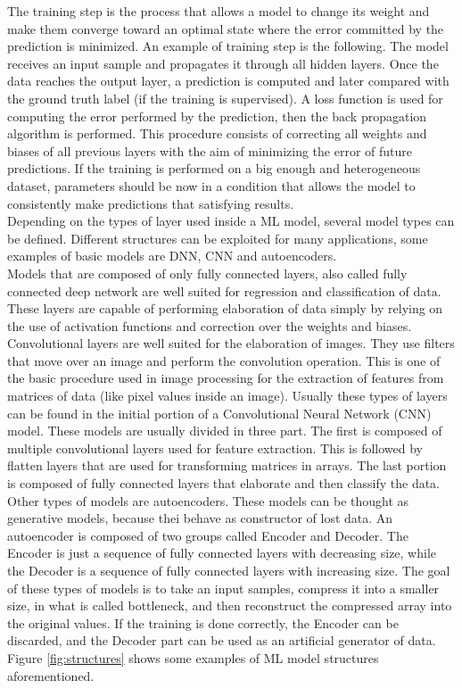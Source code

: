 \documentclass[12pt]{report}
\begin{document}
The training step is the process that allows a model to change its weight and make them converge toward an optimal state where the error committed by the prediction is minimized. An example of training step is the following. The model receives an input sample and propagates it through all hidden layers. Once the data reaches the output layer, a prediction is computed and later compared with the ground truth label (if the training is supervised). A loss function is used for computing the error performed by the prediction, then the back propagation algorithm is performed. This procedure consists of correcting all weights and biases of all previous layers with the aim of minimizing the error of future predictions. If the training is performed on a big enough and heterogeneous dataset, parameters should be now in a condition that allows the model to consistently make predictions that satisfying results.\\

Depending on the types of layer used inside a ML model, several model types can be defined. Different structures can be exploited for many applications, some examples of basic models are DNN, CNN and autoencoders. \\
Models that are composed of only fully connected layers, also called fully connected deep network are well suited for regression and classification of data. These layers are capable of performing elaboration of data simply by relying on the use of activation functions and correction over the weights and biases. 
Convolutional layers are well suited for the elaboration of images. They use filters that move over an image and perform the convolution operation. This is one of the basic procedure used in image processing for the extraction of features from matrices of data (like pixel values inside an image). Usually these types of layers can be found in the initial portion of a Convolutional Neural Network (CNN) model. These models are usually divided in three part. The first is composed of multiple convolutional layers used for feature extraction. This is followed by flatten layers that are used for transforming matrices in arrays. The last portion is composed of fully connected layers that elaborate and then classify the data.	\\
Other types of models are autoencoders. These models can be thought as generative models, because thei behave as constructor of lost data. An autoencoder is composed of two groups called Encoder and Decoder. The Encoder is just a sequence of fully connected layers with decreasing size, while the Decoder is a sequence of fully connected layers with increasing size. The goal of these types of models is to take an input samples, compress it into a smaller size, in what is called bottleneck, and then reconstruct the compressed array into the original values. If the training is done correctly, the Encoder can be discarded, and the Decoder part can be used as an artificial generator of data.\\
Figure \ref{fig:structures} shows some examples of ML model structures aforementioned.
\end{document}
